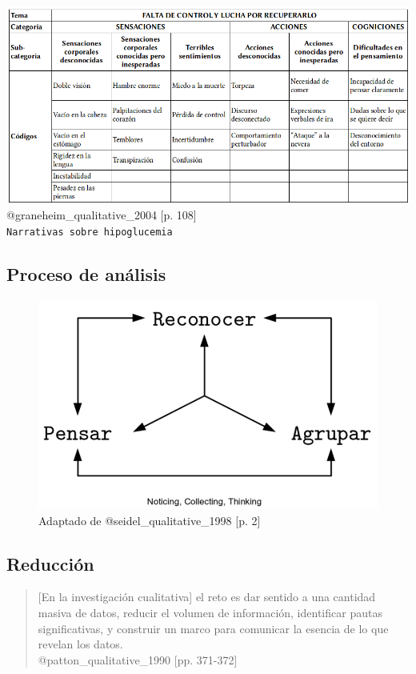 \includegraphics{imagenes-cuali/Graneheim-Lundaman-Figura1-es.png}
@graneheim\_qualitative\_2004 {[}p. 108{]}\\
\texttt{Narrativas\ sobre\ hipoglucemia}

\hypertarget{proceso-analisis}{%
\subsection{Proceso de análisis}\label{proceso-analisis}}

\begin{figure}
\centering
\includegraphics{imagenes-cuali/Seidel-NCT.png}
\caption{Adaptado de @seidel\_qualitative\_1998 {[}p. 2{]}}
\end{figure}

\hypertarget{reduccion}{%
\subsection{Reducción}\label{reduccion}}

\begin{quote}
{[}En la investigación cualitativa{]} el reto es dar sentido a una
cantidad masiva de datos, reducir el volumen de información, identificar
pautas significativas, y construir un marco para comunicar la esencia de
lo que revelan los datos.\\
@patton\_qualitative\_1990 {[}pp. 371-372{]}
\end{quote}

